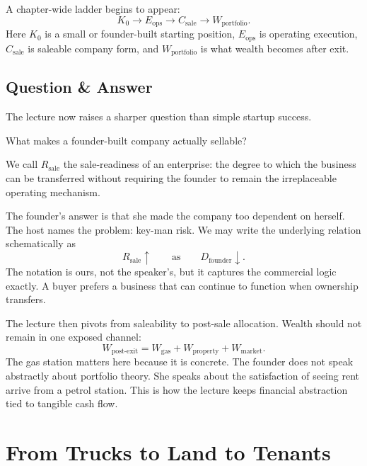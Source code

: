 A chapter-wide ladder begins to appear:
\begin{equation}
K_0 \to E_{\text{ops}} \to C_{\text{sale}} \to W_{\text{portfolio}}.
\end{equation}
Here \(K_0\) is a small or founder-built starting position, \(E_{\text{ops}}\) is operating execution, \(C_{\text{sale}}\) is saleable company form, and \(W_{\text{portfolio}}\) is what wealth becomes after exit.

\subsection{Question \& Answer}

The lecture now raises a sharper question than simple startup success.

What makes a founder-built company actually sellable?

\begin{definition}
We call \(R_{\text{sale}}\) the sale-readiness of an enterprise: the degree to which the business can be transferred without requiring the founder to remain the irreplaceable operating mechanism.
\end{definition}

The founder's answer is that she made the company too dependent on herself. The host names the problem: key-man risk. We may write the underlying relation schematically as
\begin{equation}
R_{\text{sale}}\uparrow \qquad \text{as} \qquad D_{\text{founder}}\downarrow.
\end{equation}
The notation is ours, not the speaker's, but it captures the commercial logic exactly. A buyer prefers a business that can continue to function when ownership transfers.

The lecture then pivots from saleability to post-sale allocation. Wealth should not remain in one exposed channel:
\begin{equation}
W_{\text{post-exit}}=W_{\text{gas}}+W_{\text{property}}+W_{\text{market}}.
\end{equation}
The gas station matters here because it is concrete. The founder does not speak abstractly about portfolio theory. She speaks about the satisfaction of seeing rent arrive from a petrol station. This is how the lecture keeps financial abstraction tied to tangible cash flow.

\section{From Trucks to Land to Tenants}

